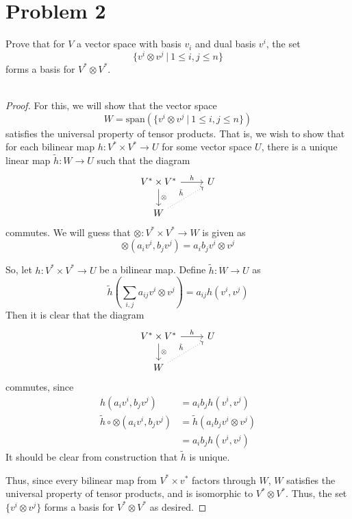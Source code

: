 \documentclass[fontsize=11pt]{scrartcl} %
\numberwithin{equation}{section} %
\numberwithin{figure}{section} %
\numberwithin{table}{section} %
\begin{document}
\section*{Problem 2}
Prove that for $V$ a vector space with basis $v_i$ and dual basis $v^i$, the set
\[
    \{v^i\otimes v^j\ |\ 1\leq i,j\leq n\}
\]
forms a basis for $V^*\otimes V^*$.
\\
\\
\begin{proof}
    For this, we will show that the vector space
\[
    W = \text{span}(\{v^i\otimes v^j\ |\ 1\leq i,j\leq n\})
\]
satisfies the universal property of
    tensor products. That is, we wish to show that for each bilinear map
    $h:V^*\times V^*\to U$ for some vector space $U$, there is a unique linear
    map $\tilde{h}:W\to U$ such that the diagram
    \[
        \begin{tikzcd}
            V^*\times V^* \arrow[d, "\otimes"] \arrow[r, "h"] & U \\
            W \arrow[ru, "\tilde{h}", dotted] & 
        \end{tikzcd}
    \]
    commutes. We will guess that $\otimes:V^*\times V^*\to W$ is given as
    \[
        \otimes(a_iv^i,b_jv^j) = a_ib_jv^i\otimes v^j
    \]

    So, let $h:V^*\times V^*\to U$ be a bilinear map. Define $\tilde{h}:W\to U$
    as 
    \[
        \tilde{h}(\sum_{i,j}a_{ij}v^i\otimes v^j)
        =a_{ij}h(v^i,v^j)
    \]
    Then it is clear that the diagram
    \[
        \begin{tikzcd}
            V^*\times V^* \arrow[d, "\otimes"] \arrow[r, "h"] & U \\
            W \arrow[ru, "\tilde{h}", dotted] & 
        \end{tikzcd}
    \]
    commutes, since
    \[
\begin{aligned}
    h(a_iv^i,b_jv^j) &= a_ib_jh(v^i,v^j)\\
    \tilde{h}\circ\otimes(a_iv^i,b_jv^j) &= \tilde{h}(a_ib_jv^i\otimes v^j)\\
    &= a_ib_jh(v^i,v^j)
\end{aligned}
    \]
    It should be clear from construction that $\tilde{h}$ is unique.

    Thus, since every bilinear map from $V^*\times v^*$ factors through $W$, $W$
    satisfies the universal property of tensor products, and is isomorphic to
    $V^*\otimes V^*$. Thus, the set $\{v^i\otimes v^j\}$ forms a basis for
    $V^*\otimes V^*$ as desired.
\end{proof}
\end{document}
